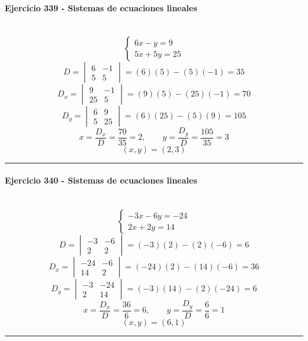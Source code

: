 \documentclass[10pt,a4paper]{article}
\newcommand{\res}[1]{\paragraph{#1}\mbox{}\\[-1.2em]}
\begin{document}
\res{Ejercicio 339 - Sistemas de ecuaciones lineales}
\[ \begin{cases}6 x - y=9\\5 x + 5 y=25\end{cases} \]
\[ D=\begin{vmatrix}6&-1\\5&5\end{vmatrix}=(6)(5)-(5)(-1)=35 \]
\[ D_x=\begin{vmatrix}9&-1\\25&5\end{vmatrix}=(9)(5)-(25)(-1)=70 \]
\[ D_y=\begin{vmatrix}6&9\\5&25\end{vmatrix}=(6)(25)-(5)(9)=105 \]
\[ x=\frac{D_x}{D}=\frac{70}{35}=2,\qquad y=\frac{D_y}{D}=\frac{105}{35}=3 \]
\[ \boxed{(x,y)=(2,3)} \]
\vspace{1mm}\hrule\vspace{2mm}
\res{Ejercicio 340 - Sistemas de ecuaciones lineales}
\[ \begin{cases}- 3 x - 6 y=-24\\2 x + 2 y=14\end{cases} \]
\[ D=\begin{vmatrix}-3&-6\\2&2\end{vmatrix}=(-3)(2)-(2)(-6)=6 \]
\[ D_x=\begin{vmatrix}-24&-6\\14&2\end{vmatrix}=(-24)(2)-(14)(-6)=36 \]
\[ D_y=\begin{vmatrix}-3&-24\\2&14\end{vmatrix}=(-3)(14)-(2)(-24)=6 \]
\[ x=\frac{D_x}{D}=\frac{36}{6}=6,\qquad y=\frac{D_y}{D}=\frac{6}{6}=1 \]
\[ \boxed{(x,y)=(6,1)} \]
\vspace{1mm}\hrule\vspace{2mm}
\end{document}
